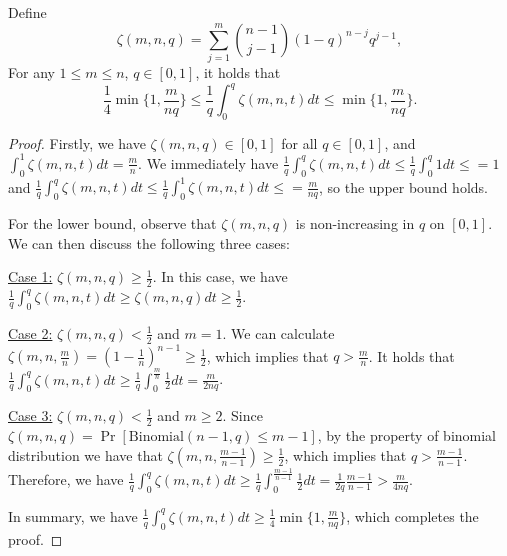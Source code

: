 
\begin{lemma}
\label{lemma:1/qint approximation}
    Define $$\zeta(m, n, q) = \sum_{j=1}^m \binom{n-1}{j-1} (1-q)^{n-j}q^{j-1},$$
    For any $1\leq m\leq n$, $q\in[0,1]$, it holds that 
    $$ \frac14\min\{1,\frac{m}{nq}\}\leq \frac1{q}\int_0^{q}\zeta(m, n, t)dt\leq \min\{1,\frac{m}{nq}\}.$$
\end{lemma}
\begin{proof}
    Firstly, we have $\zeta(m,n,q)\in[0,1]$ for all $q\in[0,1]$, and $\int_0^1\zeta(m, n, t)dt=\frac{m}{n}$.
    We immediately have $\frac1{q}\int_0^{q}\zeta(m, n, t)dt\leq\frac1{q}\int_0^{q}1dt\leq=1$ and $\frac1{q}\int_0^{q}\zeta(m, n, t)dt\leq\frac1{q}\int_0^{1}\zeta(m, n, t)dt\leq=\frac{m}{nq}$, so the upper bound holds.

    For the lower bound, observe that $\zeta(m,n,q)$ is non-increasing in $q$ on $[0,1]$. We can then discuss the following three cases:

    \underline{Case 1:} $\zeta(m,n,q)\geq\frac{1}{2}$. 
    In this case, we have $\frac1{q}\int_0^{q}\zeta(m, n, t)dt\geq \zeta(m, n, q)dt\geq\frac12$.

    \underline{Case 2:} $\zeta(m,n,q)<\frac12$ and $m=1$. We can calculate $\zeta(m,n,\frac{m}{n})=(1-\frac1{n})^{n-1}\geq\frac12$, which implies that $q>\frac{m}{n}$. It holds that $\frac1{q}\int_0^{q}\zeta(m, n, t)dt\geq \frac1{q}\int_0^{\frac{m}{n}}\frac12dt=\frac{m}{2nq}$.
    
    \underline{Case 3:} $\zeta(m,n,q)<\frac12$ and $m\geq 2$. Since $\zeta(m, n, q)=\Pr[\mathrm{Binomial}(n-1,q)\leq m-1]$, by the property of binomial distribution we have that $\zeta(m, n, \frac{m-1}{n-1})\geq\frac12$, which implies that $q>\frac{m-1}{n-1}$.
    Therefore, we have $\frac1{q}\int_0^{q}\zeta(m, n, t)dt\geq \frac1{q}\int_0^{\frac{m-1}{n-1}}\frac12dt=\frac1{2q}\frac{m-1}{n-1}>\frac{m}{4nq}$.

    In summary, we have $\frac1{q}\int_0^{q}\zeta(m, n, t)dt\geq \frac14\min\{1,\frac{m}{nq}\}$, which completes the proof.
\end{proof}


